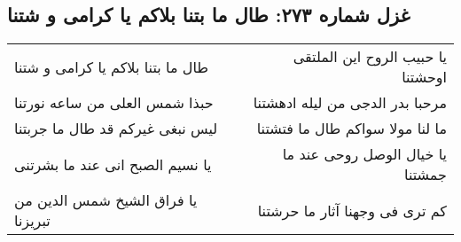 \begin{center}
\section*{غزل شماره ۲۷۳: طال ما بتنا بلاکم یا کرامی و شتنا}
\label{sec:0273}
\begin{longtable}{l p{0.5cm} r}
طال ما بتنا بلاکم یا کرامی و شتنا
&&
یا حبیب الروح این الملتقی اوحشتنا
\\
حبذا شمس العلی من ساعه نورتنا
&&
مرحبا بدر الدجی من لیله ادهشتنا
\\
لیس نبغی غیرکم قد طال ما جربتنا
&&
ما لنا مولا سواکم طال ما فتشتنا
\\
یا نسیم الصبح انی عند ما بشرتنی
&&
یا خیال الوصل روحی عند ما جمشتنا
\\
یا فراق الشیخ شمس الدین من تبریزنا
&&
کم تری فی وجهنا آثار ما حرشتنا
\\
\end{longtable}
\end{center}
